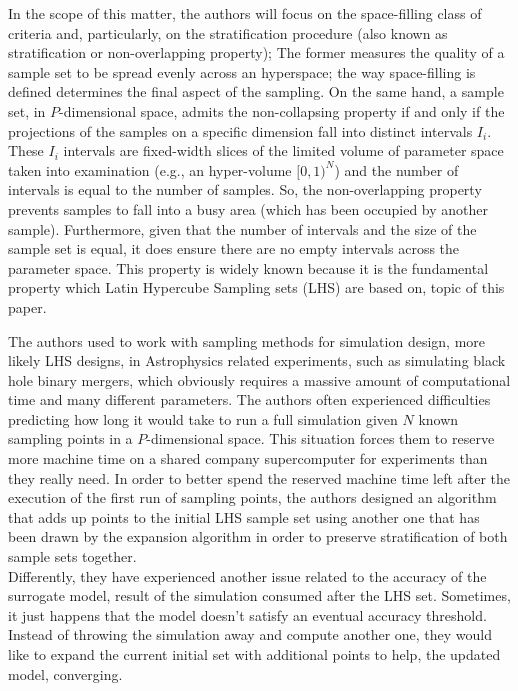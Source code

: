 \documentclass[12pt]{extarticle}
\begin{document}
In the scope of this matter, the authors will focus on the space-filling class of criteria and, particularly, on the stratification procedure (also known as stratification or non-overlapping property); The former measures the quality of a sample set to be spread evenly across an hyperspace; the way space-filling is defined determines the final aspect of the sampling. On the same hand, a sample set, in $P$-dimensional space, admits the non-collapsing property if and only if the projections of the samples on a specific dimension fall into distinct intervals $I_i$. These $I_i$ intervals are fixed-width slices of the limited volume of parameter space taken into examination (e.g., an hyper-volume $[0,1)^N$) and the number of intervals is equal to the number of samples. So, the non-overlapping property prevents samples to fall into a busy area (which has been occupied by another sample). Furthermore, given that the number of intervals and the size of the sample set is equal, it does ensure there are no empty intervals across the parameter space. This property is widely known because it is the fundamental property which Latin Hypercube Sampling sets (LHS) are based on, topic of this paper.

The authors used to work with sampling methods for simulation design, more likely LHS designs, in Astrophysics related experiments, such as simulating black hole binary mergers, which obviously requires a massive amount of computational time and many different parameters. The authors often experienced difficulties predicting how long it would take to run a full simulation given $N$ known sampling points in a $P$-dimensional space. This situation forces them to reserve more machine time on a shared company supercomputer for experiments than they really need. In order to better spend the reserved machine time left after the execution of the first run of sampling points, the authors designed an algorithm that adds up points to the initial LHS sample set using another one that has been drawn by the expansion algorithm in order to preserve stratification of both sample sets together.\\
Differently, they have experienced another issue related to the accuracy of the surrogate model, result of the simulation consumed after the LHS set. Sometimes, it just happens that the model doesn't satisfy an eventual accuracy threshold. Instead of throwing the simulation away and compute another one, they would like to expand the current initial set with additional points to help, the updated model, converging.
\end{document}
